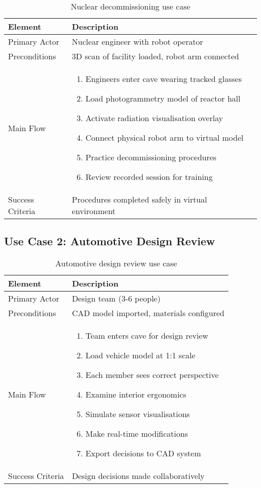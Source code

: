 \begin{table}[H]
\centering
\begin{tabularx}{\textwidth}{@{}lX@{}}
\toprule
\textbf{Element} & \textbf{Description} \\
\midrule
Primary Actor & Nuclear engineer with robot operator \\
Preconditions & 3D scan of facility loaded, robot arm connected \\
Main Flow &
\begin{enumerate}[topsep=0pt]
    \item Engineers enter cave wearing tracked glasses
    \item Load photogrammetry model of reactor hall
    \item Activate radiation visualisation overlay
    \item Connect physical robot arm to virtual model
    \item Practice decommissioning procedures
    \item Review recorded session for training
\end{enumerate} \\
Success Criteria & Procedures completed safely in virtual environment \\
\bottomrule
\end{tabularx}
\caption{Nuclear decommissioning use case}
\end{table}

\subsection{Use Case 2: Automotive Design Review}

\begin{table}[H]
\centering
\begin{tabularx}{\textwidth}{@{}lX@{}}
\toprule
\textbf{Element} & \textbf{Description} \\
\midrule
Primary Actor & Design team (3-6 people) \\
Preconditions & CAD model imported, materials configured \\
Main Flow &
\begin{enumerate}[topsep=0pt]
    \item Team enters cave for design review
    \item Load vehicle model at 1:1 scale
    \item Each member sees correct perspective
    \item Examine interior ergonomics
    \item Simulate sensor visualisations
    \item Make real-time modifications
    \item Export decisions to CAD system
\end{enumerate} \\
Success Criteria & Design decisions made collaboratively \\
\bottomrule
\end{tabularx}
\caption{Automotive design review use case}
\end{table}

